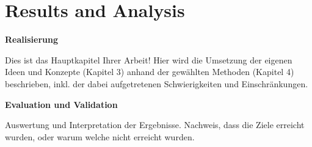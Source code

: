 \chapter{Results and Analysis}
\label{ch:ResultsAnalysis}
\textbf{Realisierung}

Dies ist das Hauptkapitel Ihrer Arbeit! Hier wird die Umsetzung der eigenen Ideen und Konzepte (Kapitel 3) anhand der gewählten Methoden (Kapitel 4) beschrieben, inkl. der dabei aufgetretenen Schwierigkeiten und Einschränkungen.\par

\textbf{Evaluation und Validation}

Auswertung und Interpretation der Ergebnisse. Nachweis, dass die Ziele erreicht wurden, oder warum welche nicht erreicht wurden.